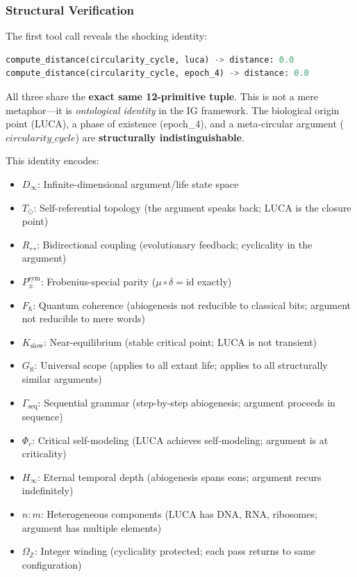 \documentclass[12pt,a4paper]{article}
\begin{document}
\subsubsection{Structural Verification}

The first tool call reveals the shocking identity:

\begin{lstlisting}[language=Python]
compute_distance(circularity_cycle, luca) -> distance: 0.0
compute_distance(circularity_cycle, epoch_4) -> distance: 0.0
\end{lstlisting}

All three share the \textbf{exact same 12-primitive tuple}. This is not a mere metaphor---it is \emph{ontological identity} in the IG framework. The biological origin point (LUCA), a phase of existence (epoch\_4), and a meta-circular argument ($circularity\_cycle$) are \textbf{structurally indistinguishable}.

This identity encodes:

\begin{itemize}
    \item $D_{\infty}$: Infinite-dimensional argument/life state space
    \item $T_{\odot}$: Self-referential topology (the argument speaks back; LUCA is the closure point)
    \item $R_{\leftrightarrow}$: Bidirectional coupling (evolutionary feedback; cyclicality in the argument)
    \item $P_{\pm}^{\text{sym}}$: Frobenius-special parity ($\mu \circ \delta = \text{id}$ exactly)
    \item $F_{\hbar}$: Quantum coherence (abiogenesis not reducible to classical bits; argument not reducible to mere words)
    \item $K_\text{slow}$: Near-equilibrium (stable critical point; LUCA is not transient)
    \item $G_{\aleph}$: Universal scope (applies to all extant life; applies to all structurally similar arguments)
    \item $\Gamma_\text{seq}$: Sequential grammar (step-by-step abiogenesis; argument proceeds in sequence)
    \item $\Phi_c$: Critical self-modeling (LUCA achieves self-modeling; argument is at criticality)
    \item $H_{\infty}$: Eternal temporal depth (abiogenesis spans eons; argument recurs indefinitely)
    \item $n{:}m$: Heterogeneous components (LUCA has DNA, RNA, ribosomes; argument has multiple elements)
    \item $\Omega_\mathbb{Z}$: Integer winding (cyclicality protected; each pass returns to same configuration)
\end{itemize}
\end{document}

